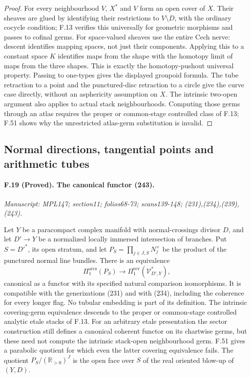 \begin{proof}
For every neighbourhood $V$, $X^*$ and $V$ form an open cover of $X$.
Their sheaves are glued by identifying their restrictions to
$V\setminus D$, with the ordinary cocycle condition; F.13 verifies
this universally for geometric morphisms and passes to cofinal germs.
For space-valued sheaves use the entire Cech nerve: descent identifies
mapping spaces, not just their components. Applying this to a constant
space $K$ identifies maps from the shape with the homotopy limit of
maps from the three shapes. This is exactly the homotopy-pushout
universal property. Passing to one-types gives the displayed groupoid
formula. The tube retraction to a point and the punctured-disc
retraction to a circle give the curve case directly, without an
asphericity assumption on $X$. The intrinsic two-open argument also
applies to actual stack neighbourhoods. Computing those germs through
an atlas requires the proper or common-stage controlled class of F.13;
F.51 shows why the unrestricted atlas-germ substitution is invalid.
\end{proof}

\subsection{Normal directions, tangential points and arithmetic tubes}

\paragraph{F.19 (Proved). The canonical functor (243).}
\textit{Manuscript: MPL147; section11; folios68-73; scans139-148; (231),(234),(239),(243).}

Let $Y$ be a paracompact complex manifold with normal-crossings divisor
$D$, and let $D'\to Y$ be a normalized locally immersed intersection
of branches. Put $S=D'^*$, its open stratum, and let
$P_S=\prod_{j\in J,S}N_j^\times$ be the product of the punctured
normal line bundles. There is an equivalence
\[
 \Pi_1^{\mathrm{arcs}}(P_S)\longrightarrow
 \Pi_1^{\mathrm{rev}}(\mathcal V^*_{D',Y}),
\]
canonical as a functor with its specified natural comparison
isomorphisms. It is compatible with the generizations (231) and with
(234), including the coherence for every longer flag. No tubular
embedding is part of its definition. The intrinsic covering-germ
equivalence descends to the proper or common-stage controlled analytic
etale stacks of F.13. For an arbitrary etale presentation the sector
construction still defines a canonical coherent functor on its
chartwise germs, but these need not compute the intrinsic stack-open
neighbourhood germ. F.51 gives a parabolic quotient for which even
the latter covering equivalence fails. The quotient
$P_S/(\mathbb R_{>0})^J$ is the
open face over $S$ of the real oriented blow-up of $(Y,D)$.

